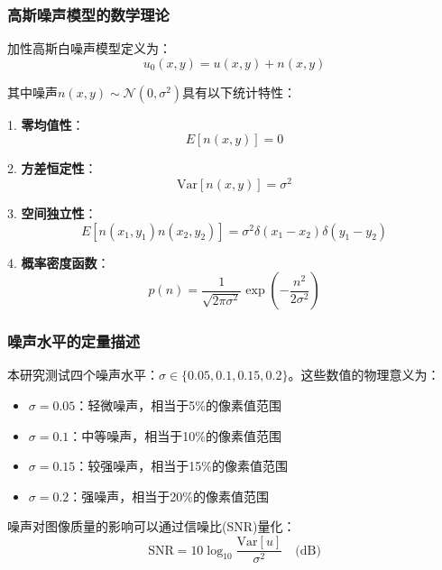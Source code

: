 \documentclass[a4paper,12pt]{ctexart}
\begin{document}
\subsubsection{高斯噪声模型的数学理论}

加性高斯白噪声模型定义为：
\begin{equation}
u_0(x,y) = u(x,y) + n(x,y)
\end{equation}

其中噪声$n(x,y) \sim \mathcal{N}(0, \sigma^2)$具有以下统计特性：

1. \textbf{零均值性}：
\begin{equation}
E[n(x,y)] = 0
\end{equation}

2. \textbf{方差恒定性}：
\begin{equation}
\text{Var}[n(x,y)] = \sigma^2
\end{equation}

3. \textbf{空间独立性}：
\begin{equation}
E[n(x_1,y_1)n(x_2,y_2)] = \sigma^2 \delta(x_1-x_2)\delta(y_1-y_2)
\end{equation}

4. \textbf{概率密度函数}：
\begin{equation}
p(n) = \frac{1}{\sqrt{2\pi\sigma^2}} \exp\left(-\frac{n^2}{2\sigma^2}\right)
\end{equation}

\subsubsection{噪声水平的定量描述}

本研究测试四个噪声水平：$\sigma \in \{0.05, 0.1, 0.15, 0.2\}$。这些数值的物理意义为：

\begin{itemize}
    \item $\sigma = 0.05$：轻微噪声，相当于5\%的像素值范围
    \item $\sigma = 0.1$：中等噪声，相当于10\%的像素值范围  
    \item $\sigma = 0.15$：较强噪声，相当于15\%的像素值范围
    \item $\sigma = 0.2$：强噪声，相当于20\%的像素值范围
\end{itemize}

噪声对图像质量的影响可以通过信噪比(SNR)量化：
\begin{equation}
\text{SNR} = 10 \log_{10} \frac{\text{Var}[u]}{\sigma^2} \quad \text{(dB)}
\end{equation}
\end{document}
